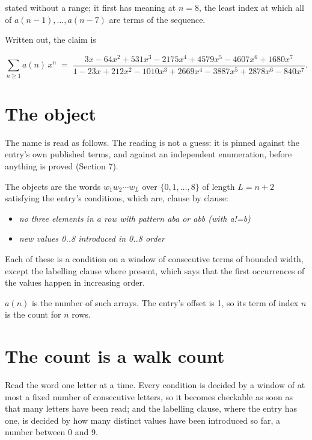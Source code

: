 \documentclass[11pt]{article}
\theoremstyle{definition}
\begin{document}
stated without a range; it first has meaning at $n = 8$, the least index at which all of $a(n-1),\dots,a(n-7)$ are terms of the sequence.

Written out, the claim is

\[\sum_{n \ge 1} a(n)\,x^n \;=\; \frac{3x - 64x^{2} + 531x^{3} - 2175x^{4} + 4579x^{5} - 4607x^{6} + 1680x^{7}}{1 - 23x + 212x^{2} - 1010x^{3} + 2669x^{4} - 3887x^{5} + 2878x^{6} - 840x^{7}}.\]

\section{The object}

The name is read as follows. The reading is not a guess: it is pinned against the entry's own published terms, and against an independent enumeration, before anything is proved (Section 7).

The objects are the words $w_1 w_2 \cdots w_L$ over $\{0,1,\dots,8\}$ of length $L = n + 2$ satisfying the entry's conditions, which are, clause by clause:

\begin{itemize}

\item {\itshape no three elements in a row with pattern aba or abb (with a!=b)}

\item {\itshape new values 0..8 introduced in 0..8 order}

\end{itemize}

Each of these is a condition on a window of consecutive terms of bounded width, except the labelling clause where present, which says that the first occurrences of the values happen in increasing order.

$a(n)$ is the number of such arrays. The entry's offset is 1, so its term of index $n$ is the count for $n$ rows.

\section{The count is a walk count}

Read the word one letter at a time. Every condition is decided by a window of at most a fixed number of consecutive letters, so it becomes checkable as soon as that many letters have been read; and the labelling clause, where the entry has one, is decided by how many distinct values have been introduced so far, a number between $0$ and 9.
\end{document}
